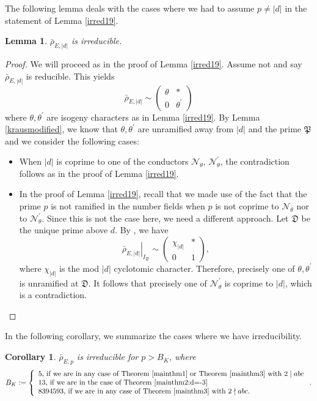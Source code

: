 \documentclass[]{article}
\newtheorem{corollary}{Corollary}
\newtheorem{lemma}{Lemma}
\newcommand {\mfp}{{\mathfrak{P}}}
\newcounter{cases}
\begin{document}
The following lemma deals with the cases where we had to assume $p\ne |d|$ in the statement of Lemma \ref{irred19}.

\begin{lemma}\label{lemma:irred,d=23}
$\bar{\rho}_{E, |d|}$ is irreducible.
\end{lemma}

\begin{proof}
    We will proceed as in the proof of Lemma \ref{irred19}. Assume not and say $\bar{\rho}_{E, |d|}$ is reducible. This yields $$
\bar{\rho}_{E, |d|} \sim\left(\begin{array}{cc}
\theta & * \\
0 & \theta^{\prime}
\end{array}\right)
$$where $\theta,\theta^{\prime}$ are isogeny characters as in Lemma \ref{irred19}. By Lemma \ref{krausmodified}, we know that $\theta,\theta^{\prime}$ are unramified away from $|d|$ and the prime $\mfp$ and we consider the following cases:
\begin{itemize}
    \item When $|d|$ is coprime to one of the conductors $\mathcal{N}_\theta$, $\mathcal{N}_\theta^{\prime}$, the contradiction follows as in the proof of Lemma \ref{irred19}.
    \item In the proof of Lemma \ref{irred19}, recall that we made use of the fact that the prime $p$ is not ramified in the number fields  when $p$ is not coprime to $\mathcal{N}_\theta$ nor to $\mathcal{N}_\theta^{\prime}$. Since this is not the case here, we need a different approach. Let $\mathfrak{D}$ be the unique prime above $d$. By \cite[Proposition 6.1]{freitas2015fermat}, we have $$ \left.\bar{\rho}_{E, |d|}\right|_{I_{\mathfrak{D}}} \sim\left(\begin{array}{ll}
\chi_{|d|} & * \\
0 & 1
\end{array}\right),$$where $\chi_{|d|}$ is the mod $|d|$ cyclotomic character. Therefore, precisely one of $\theta, \theta^{\prime}$ is unramified at $\mathfrak{D}$. It follows that precisely one of $\mathcal{N}_\theta^{\prime}$ is coprime to $|d|$, which is a contradiction.
\end{itemize}
\end{proof}

In the following corollary, we summarize the cases where we have irreducibility.

\begin{corollary}\label{bound:B_K}
$\bar{\rho}_{E, p}$ is irreducible for $p>B_K$, where $$B_K:=\left\{\begin{array}{l}
5 \text {, if we are in any case of Theorem \ref{mainthm1} or Theorem \ref{mainthm3} with $2\mid abc$} \\
13 \text {, if we are in the case of Theorem \ref{mainthm2:d=-3}} \\
8394593 \text {, if we are in any case of Theorem \ref{mainthm3} with $2\nmid abc$. }
\end{array}\right..$$       
\end{corollary}
\end{document}
